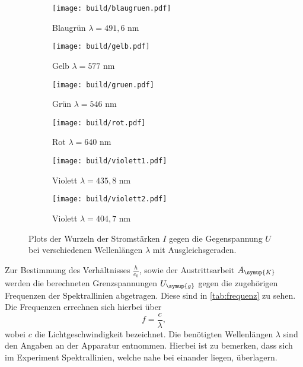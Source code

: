 \begin{figure}
  \centering
  \begin{subfigure}{0.49\textwidth}
    \centering
    \texttt{[image: build/blaugruen.pdf]}
    \caption{Blaugrün $\lambda = 491,6$ nm}
  \end{subfigure}
  \begin{subfigure}{0.49\textwidth}
    \centering
    \texttt{[image: build/gelb.pdf]}
    \caption{Gelb $\lambda = 577$ nm}
  \end{subfigure}

  \begin{subfigure}{0.49\textwidth}
    \centering
    \texttt{[image: build/gruen.pdf]}
    \caption{Grün $\lambda = 546$ nm}
  \end{subfigure}
  \begin{subfigure}{0.49\textwidth}
    \centering
    \texttt{[image: build/rot.pdf]}
    \caption{Rot $\lambda = 640$ nm}
  \end{subfigure}

  \begin{subfigure}{0.49\textwidth}
    \centering
    \texttt{[image: build/violett1.pdf]}
    \caption{Violett $\lambda = 435,8$ nm}
  \end{subfigure}
  \begin{subfigure}{0.49\textwidth}
    \centering
    \texttt{[image: build/violett2.pdf]}
    \caption{Violett $\lambda = 404,7$ nm}
  \end{subfigure}
  \caption{Plots der Wurzeln der Stromstärken $I$ gegen die Gegenspannung $U$ bei verschiedenen Wellenlängen $\lambda$ mit Ausgleichsgeraden.}
  \label{fig:farben}
\end{figure}


Zur Bestimmung des Verhältnisses $\frac{h}{e_0}$, sowie der Austrittsarbeit $A_{\symup{K}}$ werden die berechneten Grenzspannungen $U_{\symup{g}}$
gegen die zugehörigen Frequenzen der Spektrallinien abgetragen. Diese sind in \autoref{tab:frequenz} zu sehen. Die Frequenzen errechnen sich hierbei über 
\begin{equation}
\label{eqn:frequenz}
  f = \frac{c}{\lambda},
\end{equation}  
wobei $c$ die Lichtgeschwindigkeit bezeichnet. Die benötigten Wellenlängen $\lambda$ sind den Angaben an der Apparatur entnommen. Hierbei ist zu bemerken, dass sich im Experiment Spektrallinien, welche nahe bei einander liegen, überlagern.
